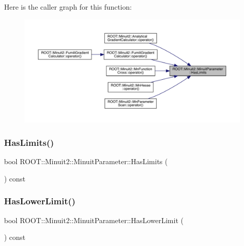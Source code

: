 Here is the caller graph for this function\+:\nopagebreak
\begin{figure}[H]
\begin{center}
\leavevmode
\includegraphics[width=350pt]{dd/dfb/classROOT_1_1Minuit2_1_1MinuitParameter_a6319fe000027da162c4adad8782ef27b_icgraph}
\end{center}
\end{figure}
\mbox{\label{classROOT_1_1Minuit2_1_1MinuitParameter_a6319fe000027da162c4adad8782ef27b}} 
\subsubsection{\texorpdfstring{HasLimits()}{HasLimits()}\hspace{0.1cm}{\footnotesize\ttfamily [2/2]}}
{\footnotesize\ttfamily bool R\+O\+O\+T\+::\+Minuit2\+::\+Minuit\+Parameter\+::\+Has\+Limits (\begin{DoxyParamCaption}{ }\end{DoxyParamCaption}) const\hspace{0.3cm}{\ttfamily [inline]}}

\mbox{\label{classROOT_1_1Minuit2_1_1MinuitParameter_a61b9c27aff1b1d7bf85bed898dd50dda}} 
\subsubsection{\texorpdfstring{HasLowerLimit()}{HasLowerLimit()}\hspace{0.1cm}{\footnotesize\ttfamily [1/2]}}
{\footnotesize\ttfamily bool R\+O\+O\+T\+::\+Minuit2\+::\+Minuit\+Parameter\+::\+Has\+Lower\+Limit (\begin{DoxyParamCaption}{ }\end{DoxyParamCaption}) const\hspace{0.3cm}{\ttfamily [inline]}}

